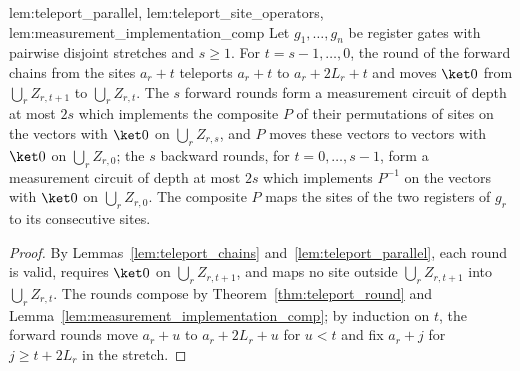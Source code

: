\begin{lemma}
{        lem:teleport_parallel, lem:teleport_site_operators,
        lem:measurement_implementation_comp}
    Let $g_1,\dots,g_n$ be register gates with pairwise disjoint stretches and
    $s\ge1$. For $t=s-1,\dots,0$, the round of the forward chains from the
    sites $a_r+t$ teleports $a_r+t$ to $a_r+2L_r+t$ and moves $\ket0$ from
    $\bigcup_rZ_{r,t+1}$ to $\bigcup_rZ_{r,t}$. The $s$ forward rounds form a
    measurement circuit of depth at most $2s$ which implements the composite
    $P$ of their permutations of sites on the vectors with $\ket0$ on
    $\bigcup_rZ_{r,s}$, and $P$ moves these vectors to vectors with $\ket0$ on
    $\bigcup_rZ_{r,0}$; the $s$ backward rounds, for $t=0,\dots,s-1$, form a
    measurement circuit of depth at most $2s$ which implements $P^{-1}$ on the
    vectors with $\ket0$ on $\bigcup_rZ_{r,0}$. The composite $P$ maps the
    sites of the two registers of $g_r$ to its consecutive sites.
\end{lemma}
\begin{proof}
    \leanok
    By Lemmas~\ref{lem:teleport_chains} and~\ref{lem:teleport_parallel}, each
    round is valid, requires $\ket0$ on $\bigcup_rZ_{r,t+1}$, and maps no site
    outside $\bigcup_rZ_{r,t+1}$ into $\bigcup_rZ_{r,t}$. The rounds compose by
    Theorem~\ref{thm:teleport_round} and
    Lemma~\ref{lem:measurement_implementation_comp}; by induction on $t$, the
    forward rounds move $a_r+u$ to $a_r+2L_r+u$ for $u<t$ and fix $a_r+j$ for
    $j\ge t+2L_r$ in the stretch.
\end{proof}

